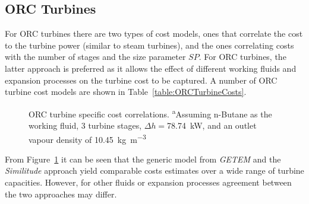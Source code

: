     \subsection{ORC Turbines}  
        For \ac{ORC} turbines there are two types of cost models, ones that correlate the cost to the turbine power (similar to steam turbines), and the ones correlating costs with the number of stages and the size parameter \(SP\). For \ac{ORC} turbines, the latter approach is preferred as it allows the effect of different working fluids and expansion processes on the turbine cost to be captured. A number of \ac{ORC} turbine cost models are shown in Table~\ref{table:ORCTurbineCosts}.
        
        \begin{table}[H]
            \caption[ORC turbine cost correlations.]{ORC turbine cost correlations.\(\Dot{W}\) is the fluid power in \unit{\kilo\watt}, \(\Dot{W}_s\) is the shaft power in \unit{\kilo\watt}, and \(\Dot{W}_e\) is the electrical power in \unit{\kilo\watt}.}
            \centering 
            \label{table:ORCTurbineCosts}
            \scalebox{0.8}{
                
            }
        \end{table}


        \begin{figure}[H]
            \centering
            
            \caption[ORC turbine specific cost correlations.]{ORC turbine specific cost correlations. \textsuperscript{a}Assuming n-Butane as the working fluid, \num{3} turbine stages, \(\Delta h=\)\qty{78.74}{\kilo\watt}, and an outlet vapour density of \qty{10.45}{\kg\per\m\cubed}}
            \label{fig:prosim_litrev_ORCturb_speccost}
        \end{figure}

        From Figure~\ref{fig:prosim_litrev_ORCturb_speccost} it can be seen that the generic model from \emph{GETEM} and the \emph{Similitude} approach yield comparable costs estimates over a wide range of turbine capacities. However, for other fluids or expansion processes agreement between the two approaches may differ.
    
